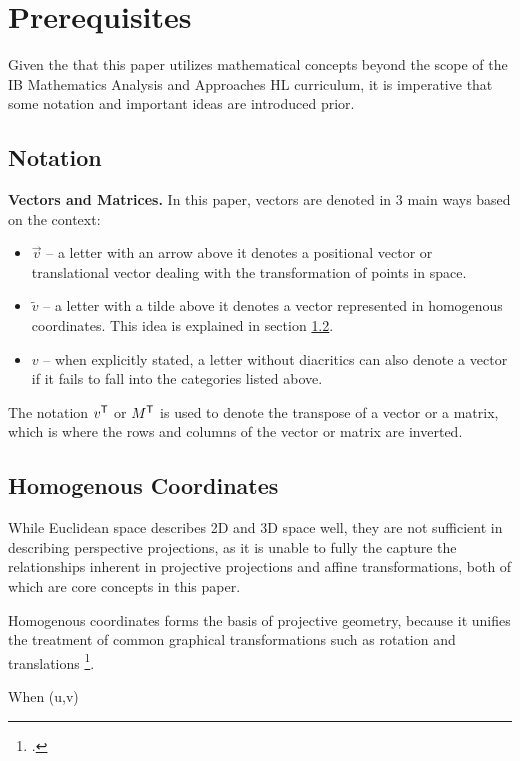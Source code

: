 \section{Prerequisites}

Given the that this paper utilizes mathematical concepts beyond the scope of the IB Mathematics Analysis and Approaches HL curriculum, it is imperative that some notation and important ideas are introduced prior.

\subsection{Notation}
\textbf{Vectors and Matrices.} In this paper, vectors are denoted in 3 main ways based on the context:
\begin{itemize}[leftmargin=!, itemindent=-4ex]
    \item \textbf{$\vec{v}$} -- a letter with an arrow above it denotes a positional vector or translational vector dealing with the transformation of points in space.
    \item \textbf{$\widetilde{v}$} -- a letter with a tilde above it denotes a vector represented in homogenous coordinates. This idea is explained in section \ref{sec:homogenous}.
    \item \textbf{$v$} -- when explicitly stated, a letter without diacritics can also denote a vector if it fails to fall into the categories listed above. 
\end{itemize}
The notation $v^{\mathsf{T}}$ or $M^{\mathsf{T}}$ is used to denote the transpose of a vector or a matrix, which is where the rows and columns of the vector or matrix are inverted. 

\subsection{Homogenous Coordinates} \label{sec:homogenous}

While Euclidean space describes 2D and 3D space well, they are not sufficient in describing perspective projections, as it is unable to fully the capture the relationships inherent in projective projections and affine transformations, both of which are core concepts in this paper. 

Homogenous coordinates forms the basis of projective geometry, because it unifies the treatment of common graphical transformations such as rotation and translations \footcite[][1]{bloomenthalHomogeneousCoordinates1994}. 

When
(u,v)


